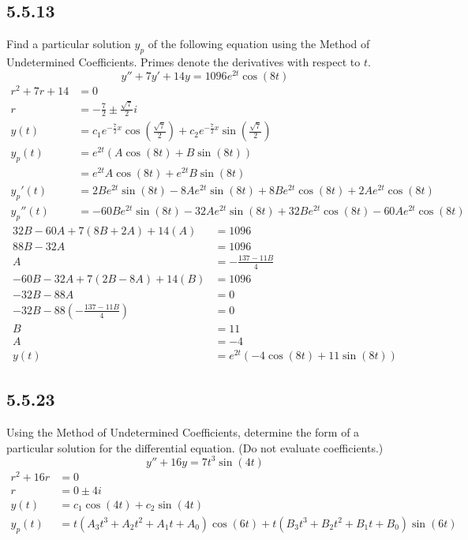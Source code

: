 \documentclass{article}
\begin{document}
\subsection{5.5.13}
Find a particular solution $ y_p $ of the following equation using the Method of Undetermined Coefficients. Primes denote the derivatives with respect to $ t $.
$$ y'' + 7y' + 14y = 1096e^{2t}\cos(8t) $$
\begin{align*}
	r^2 + 7r + 14 & = 0 \\
	r & = -\frac{7}{2} \pm \frac{\sqrt{7}}{2}i \\
	y(t) & = c_1e^{-\frac{7}{2}x}\cos\left(\frac{\sqrt{7}}{2}\right) + c_2e^{-\frac{7}{2}x}\sin\left(\frac{\sqrt{7}}{2}\right) \\
	y_p(t) & = e^{2t}(A\cos(8t) + B\sin(8t)) \\
		   & = e^{2t}A\cos(8t) + e^{2t}B\sin(8t) \\
	y_p'(t) & = 2Be^{2t}\sin(8t) - 8Ae^{2t}\sin(8t) + 8Be^{2t}\cos(8t) + 2Ae^{2t}\cos(8t) \\
	y_p''(t) & = -60Be^{2t}\sin(8t) - 32Ae^{2t}\sin(8t) + 32Be^{2t}\cos(8t) - 60Ae^{2t}\cos(8t)
\end{align*}
\begin{align*}
	32B - 60A + 7(8B + 2A) + 14(A) & = 1096 \\
	88B - 32A & = 1096 \\
	A & = -\frac{137 - 11B}{4} \\
	-60B - 32A + 7(2B - 8A) + 14(B) & = 1096 \\
	-32B - 88A & = 0 \\
	-32B - 88 \left( -\frac{137 - 11B}{4} \right) & = 0 \\
	B & = 11 \\
	A & = -4 \\
	y(t) & = e^{2t}(-4\cos(8t) + 11\sin(8t))
\end{align*}

\subsection{5.5.23}
Using the Method of Undetermined Coefficients, determine the form of a particular solution for the differential equation. (Do not evaluate coefficients.)
$$ y'' + 16y = 7t^3\sin(4t) $$
\begin{align*}
	r^2 + 16r & = 0 \\
	r & = 0 \pm 4i \\
	y(t) & = c_1\cos(4t) + c_2\sin(4t) \\
	y_p(t) & = t(A_3t^3 + A_2t^2 + A_1t + A_0)\cos(6t) + t(B_3t^3 + B_2t^2 + B_1t + B_0)\sin(6t)
\end{align*}
\end{document}
